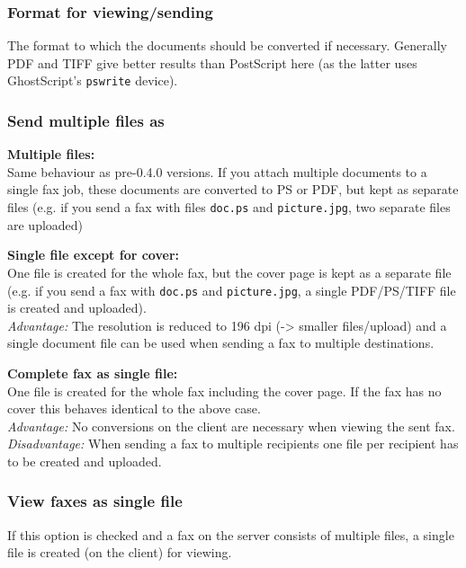 \documentclass[a4paper,10pt]{scrartcl}
\begin{document}
\subsubsection{Format for viewing/sending}

The format to which the documents should be converted if necessary. Generally PDF and TIFF give better results than PostScript here (as the latter uses GhostScript's \texttt{pswrite} device).

\subsubsection{Send multiple files as}

{\parindent0pt
\textbf{Multiple files:}\\
Same behaviour as pre-0.4.0 versions. If you attach multiple documents to a single fax job, these documents are converted to PS or PDF, but kept as separate files (e.g. if you send a fax with files \texttt{doc.ps} and \texttt{picture.jpg}, two separate files are uploaded)
\medskip

\textbf{Single file except for cover:}\\
One file is created for the whole fax, but the cover page is kept as a separate file (e.g. if you send a fax with \texttt{doc.ps} and \texttt{picture.jpg}, a single PDF/PS/TIFF file is created and uploaded).\\
\textit{Advantage:} The resolution is reduced to 196 dpi (-> smaller files/upload) and a single document file can be used when sending a fax to multiple destinations.
\medskip

\textbf{Complete fax as single file:}\\
One file is created for the whole fax including the cover page. If the fax has no cover this behaves identical to the above case.\\
\textit{Advantage:} No conversions on the client are necessary when viewing the sent fax.\\
\textit{Disadvantage:} When sending a fax to multiple recipients one file per recipient has to be created and uploaded.
}

\subsubsection{View faxes as single file}
If this option is checked and a fax on the server consists of multiple files, a single file is created (on the client) for viewing.
\end{document}
